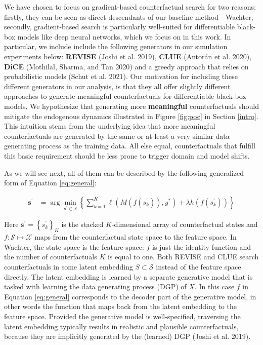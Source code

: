 \documentclass[conference,final,]{IEEEtran}
\begin{document}
We have chosen to focus on gradient-based counterfactual search for two reasons: firstly, they can be seen as direct descendants of our baseline method - Wachter; secondly, gradient-based search is particularly well-suited for differentiable black-box models like deep neural networks, which we focus on in this work. In particular, we include include the following generators in our simulation experiments below: \textbf{REVISE} (Joshi et al. 2019), \textbf{CLUE} (Antorán et al. 2020), \textbf{DiCE} (Mothilal, Sharma, and Tan 2020) and a greedy approach that relies on probabilistic models (Schut et al. 2021). Our motivation for including these different generators in our analysis, is that they all offer slightly different approaches to generate meaningful counterfactuals for differentiable black-box models. We hypothesize that generating more \textbf{meaningful} counterfactuals should mitigate the endogenous dynamics illustrated in Figure \ref{fig:poc} in Section \ref{intro}. This intuition stems from the underlying idea that more meaningful counterfactuals are generated by the same or at least a very similar data generating process as the training data. All else equal, counterfactuals that fulfill this basic requirement should be less prone to trigger domain and model shifts.

As we will see next, all of them can be described by the following generalized form of Equation \eqref{eq:general}:

\begin{equation}
\begin{aligned}
\mathbf{s}^\prime &= \arg \min_{\mathbf{s}^\prime \in \mathcal{S}} \left\{ \sum_{k=1}^{K} {\ell(M(f(s_k^\prime)),y^*)}+ \lambda {h(f(s_k^\prime)) }  \right\} \label{eq:general}
\end{aligned} 
\end{equation}

Here \(\mathbf{s}^\prime=\left\{s_k^\prime\right\}_K\) is the stacked \(K\)-dimensional array of counterfactual states and \(f: \mathcal{S} \mapsto \mathcal{X}\) maps from the counterfactual state space to the feature space. In Wachter, the state space is the feature space: \(f\) is just the identity function and the number of counterfactuals \(K\) is equal to one. Both REVISE and CLUE search counterfactuals in some latent embedding \(S \subset \mathcal{S}\) instead of the feature space directly. The latent embedding is learned by a separate generative model that is tasked with learning the data generating process (DGP) of \(X\). In this case \(f\) in Equation \eqref{eq:general} corresponds to the decoder part of the generative model, in other words the function that maps back from the latent embedding to the feature space. Provided the generative model is well-specified, traversing the latent embedding typically results in realistic and plausible counterfactuals, because they are implicitly generated by the (learned) DGP (Joshi et al. 2019).
\end{document}
